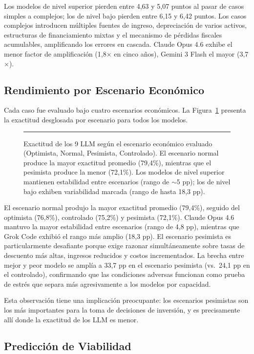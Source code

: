 \documentclass[12pt,a4paper]{article}
\begin{document}
Los modelos de nivel superior pierden entre 4,63 y 5,07 puntos al pasar de casos simples a complejos; los de nivel bajo pierden entre 6,15 y 6,42 puntos. Los casos complejos introducen múltiples fuentes de ingreso, depreciación de varios activos, estructuras de financiamiento mixtas y el mecanismo de pérdidas fiscales acumulables, amplificando los errores en cascada. Claude Opus 4.6 exhibe el menor factor de amplificación (1,8$\times$ en cinco años), Gemini 3 Flash el mayor (3,7$\times$).

\subsection{Rendimiento por Escenario Económico}

Cada caso fue evaluado bajo cuatro escenarios económicos. La Figura~\ref{fig:escenarios} presenta la exactitud desglosada por escenario para todos los modelos.

\begin{figure}[ht]
\centering
\rule{0.9\linewidth}{5cm}
\caption{Exactitud de los 9 LLM según el escenario económico evaluado (Optimista, Normal, Pesimista, Controlado). El escenario normal produce la mayor exactitud promedio (79,4\%), mientras que el pesimista produce la menor (72,1\%). Los modelos de nivel superior mantienen estabilidad entre escenarios (rango de $\sim$5 pp); los de nivel bajo exhiben variabilidad marcada (rango de hasta 18,3 pp).}
\label{fig:escenarios}
\end{figure}

El escenario normal produjo la mayor exactitud promedio (79,4\%), seguido del optimista (76,8\%), controlado (75,2\%) y pesimista (72,1\%). Claude Opus 4.6 mantuvo la mayor estabilidad entre escenarios (rango de 4,8 pp), mientras que Grok Code exhibió el rango más amplio (18,3 pp). El escenario pesimista es particularmente desafiante porque exige razonar simultáneamente sobre tasas de descuento más altas, ingresos reducidos y costos incrementados. La brecha entre mejor y peor modelo se amplía a 33,7 pp en el escenario pesimista (vs.\ 24,1 pp en el controlado), confirmando que las condiciones adversas funcionan como prueba de estrés que separa más agresivamente a los modelos por capacidad.

Esta observación tiene una implicación preocupante: los escenarios pesimistas son los más importantes para la toma de decisiones de inversión, y es precisamente allí donde la exactitud de los LLM es menor.

\subsection{Predicción de Viabilidad}
\end{document}

